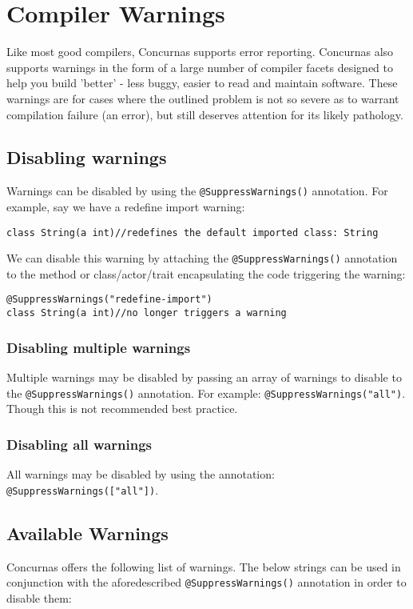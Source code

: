 \documentclass[conc-doc]{subfiles}
\begin{document}
	\chapter[Compiler Warnings]{Compiler Warnings}

Like most good compilers, Concurnas supports error reporting. Concurnas also supports warnings in the form of a large number of compiler facets designed to help you build 'better' - less buggy, easier to read and maintain software. These warnings are for cases where the outlined problem is not so severe as to warrant compilation failure (an error), but still deserves attention for its likely pathology.


\section{Disabling warnings}
Warnings can be disabled by using the \lstinline{@SuppressWarnings()} annotation. For example, say we have a redefine import warning:

\begin{lstlisting}
class String(a int)//redefines the default imported class: String
\end{lstlisting}

We can disable this warning by attaching the \lstinline{@SuppressWarnings()} annotation to the method or class/actor/trait encapsulating the code triggering the warning:

\begin{lstlisting}
@SuppressWarnings("redefine-import")
class String(a int)//no longer triggers a warning
\end{lstlisting}

\subsection{Disabling multiple warnings}
Multiple warnings may be disabled by passing an array of warnings to disable to the \lstinline{@SuppressWarnings()} annotation. For example: \lstinline{@SuppressWarnings("all")}. Though this is not recommended best practice.

\subsection{Disabling all warnings}
All warnings may be disabled by using the annotation: \lstinline{@SuppressWarnings(["all"])}.

\section{Available Warnings}
Concurnas offers the following list of warnings. The below strings can be used in conjunction with the aforedescribed \lstinline{@SuppressWarnings()} annotation in order to disable them:
\end{document}
